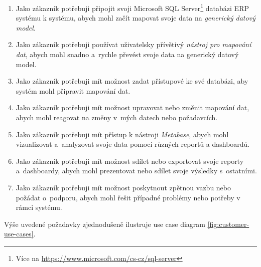 \begin{enumerate}
    \item Jako zákazník potřebuji připojit svoji Microsoft SQL Server\footnote{Více na \url{https://www.microsoft.com/cs-cz/sql-server}} databázi ERP systému k systému, abych mohl začít mapovat svoje data na \textit{generický datový model}.
    \item Jako zákazník potřebuji používat uživatelsky přívětivý \textit{nástroj pro mapování dat}, abych mohl snadno a~rychle převést svoje data na generický datový model.
    \item Jako zákazník potřebuji mít možnost zadat přístupové ke své databázi, aby systém mohl připravit mapování dat.
    \item Jako zákazník potřebuji mít možnost upravovat nebo změnit mapování dat, abych mohl reagovat na změny v~mých datech nebo požadavcích.
    \item Jako zákazník potřebuji mít přístup k nástroji \textit{Metabase}, abych mohl vizualizovat a~analyzovat svoje data pomocí různých reportů a dashboardů.
    \item Jako zákazník potřebuji mít možnost sdílet nebo exportovat svoje reporty a~dashboardy, abych mohl prezentovat nebo sdílet svoje výsledky s~ostatními.
    \item Jako zákazník potřebuji mít možnost poskytnout zpětnou vazbu nebo požádat o~podporu, abych mohl řešit případné problémy nebo potřeby v rámci systému.
\end{enumerate}

Výše uvedené požadavky zjednodušeně ilustruje use case diagram \ref{fig:customer-use-cases}.

